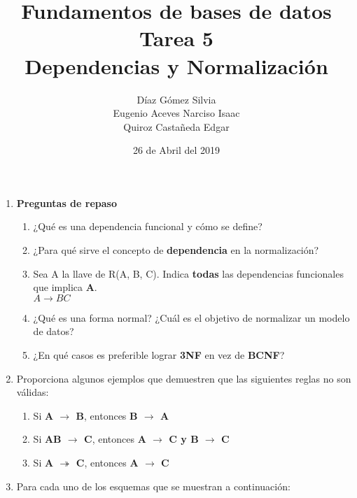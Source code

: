 \documentclass{article}
\begin{document}
    \title{
        Fundamentos de bases de datos \\
        Tarea 5 \\
        Dependencias y Normalización
    }
    \author{
        Díaz Gómez Silvia \\
        Eugenio Aceves Narciso Isaac \\
        Quiroz Castañeda Edgar
    }
    \date {
        26 de Abril del 2019    
    }
    \maketitle
    
    \begin{enumerate}
    	
    
    \item { \textbf{Preguntas de repaso}}
    \begin{enumerate}[label = \alph*.]
        \item ¿Qué es una dependencia funcional y cómo se define?
        \item ¿Para qué sirve el concepto de \textbf{dependencia} en la normalización?
        \item Sea A la llave de R(A, B, C). Indica \textbf{todas} las dependencias funcionales que implica \textbf{A}. \\
        $A \rightarrow BC$\\
        
        \item ¿Qué es una forma normal? ¿Cuál es el objetivo de normalizar un modelo de datos?
        \item ¿En qué casos es preferible lograr \textbf{3NF} en vez de \textbf{BCNF}?
    \end{enumerate}

    \item
    Proporciona algunos ejemplos que demuestren que las siguientes reglas no son válidas:
    \begin{enumerate}
    	\item Si \textbf{A $\rightarrow$ B}, entonces  \textbf{B $\rightarrow$ A}
    	\item Si \textbf{AB $\rightarrow$ C}, entonces  \textbf{A $\rightarrow$ C y B $\rightarrow$ C}
    	\item Si \textbf{A $\twoheadrightarrow$ C}, entonces \textbf{A $\rightarrow$ C}
    \end{enumerate}
       
    \item Para cada uno de los esquemas que se muestran a continuación:
    

\end{enumerate}
\end{document}

